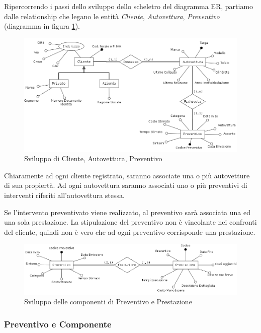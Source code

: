 			Ripercorrendo i passi dello sviluppo dello scheletro del diagramma ER, partiamo dalle relationship che legano le entità \emph{Cliente}, \emph{Autovettura}, \emph{Preventivo} (diagramma in figura \ref{fig:cliente_autovettura_preventivo}).			
		
			\begin{figure}[H]
				\centering
				\includegraphics[width=13cm]{images/finitures/cliente_autovettura_preventivo.png}
				\caption{Sviluppo di Cliente, Autovettura, Preventivo}
				\label{fig:cliente_autovettura_preventivo}
			\end{figure}
			
			Chiaramente ad ogni cliente registrato, saranno associate una o più autovetture di sua propiertà. Ad ogni autovettura saranno associati uno o più preventivi di interventi riferiti all'autovettura stessa.
			
			Se l'intervento preventivato viene realizzato, al preventivo sarà associata una ed una sola prestazione. La stipulazione del preventivo non è vincolante nei confronti del cliente, quindi non è vero che ad ogni preventivo corrisponde una prestazione.
			
			\begin{figure}[H]
				\centering
				\includegraphics[width=13cm]{images/finitures/preventivo_prestazione.png}
				\caption{Sviluppo delle componenti di Preventivo e Prestazione}
				\label{fig:preventivo_prestazione}
			\end{figure}
		
		\subsubsection{Preventivo e Componente}
		
